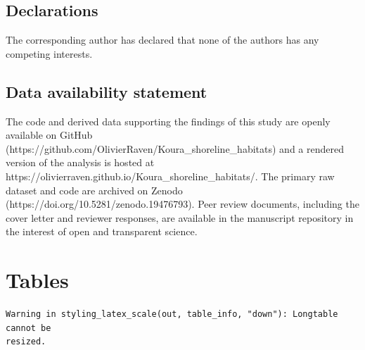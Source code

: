 \documentclass[
  12pt,
  a4paper,
  oneside]{scrbook}
\newcounter{none} %
\begin{document}
\subsection{Declarations}\label{declarations-1}

The corresponding author has declared that none of the authors has any
competing interests.

\subsection{Data availability
statement}\label{data-availability-statement-1}

The code and derived data supporting the findings of this study are
openly available on GitHub
(https://github.com/OlivierRaven/Koura\_shoreline\_habitats) and a
rendered version of the analysis is hosted at
https://olivierraven.github.io/Koura\_shoreline\_habitats/. The primary
raw dataset and code are archived on Zenodo
(https://doi.org/10.5281/zenodo.19476793). Peer review documents,
including the cover letter and reviewer responses, are available in the
manuscript repository in the interest of open and transparent science.

\section{Tables}\label{tables-1}

\begin{verbatim}
Warning in styling_latex_scale(out, table_info, "down"): Longtable cannot be
resized.
\end{verbatim}
\end{document}

